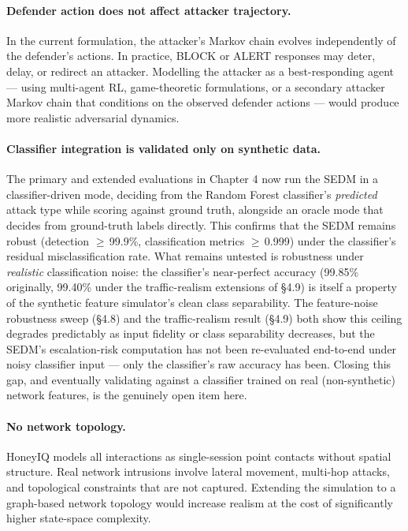 \paragraph{Defender action does not affect attacker trajectory.}
In the current formulation, the attacker's Markov chain evolves
independently of the defender's actions.
In practice, BLOCK or ALERT responses may deter, delay, or redirect an
attacker.
Modelling the attacker as a best-responding agent --- using multi-agent RL,
game-theoretic formulations, or a secondary attacker Markov chain that
conditions on the observed defender actions --- would produce more realistic
adversarial dynamics.

\paragraph{Classifier integration is validated only on synthetic data.}
The primary and extended evaluations in Chapter 4 now run the SEDM in a
classifier-driven mode, deciding from the Random Forest classifier's
\emph{predicted} attack type while scoring against ground truth, alongside
an oracle mode that decides from ground-truth labels directly.
This confirms that the SEDM remains robust (detection $\ge$\,99.9\%,
classification metrics $\ge$\,0.999) under the classifier's residual
misclassification rate.
What remains untested is robustness under \emph{realistic} classification
noise: the classifier's near-perfect accuracy (99.85\% originally, 99.40\%
under the traffic-realism extensions of \S4.9) is itself a property of the
synthetic feature simulator's clean class separability.
The feature-noise robustness sweep (\S4.8) and the traffic-realism result
(\S4.9) both show this ceiling degrades predictably as input fidelity or
class separability decreases, but the SEDM's escalation-risk computation
has not been re-evaluated end-to-end under noisy classifier input --- only
the classifier's raw accuracy has been.
Closing this gap, and eventually validating against a classifier trained on
real (non-synthetic) network features, is the genuinely open item here.

\paragraph{No network topology.}
HoneyIQ models all interactions as single-session point contacts without
spatial structure.
Real network intrusions involve lateral movement, multi-hop attacks, and
topological constraints that are not captured.
Extending the simulation to a graph-based network topology would increase
realism at the cost of significantly higher state-space complexity.

